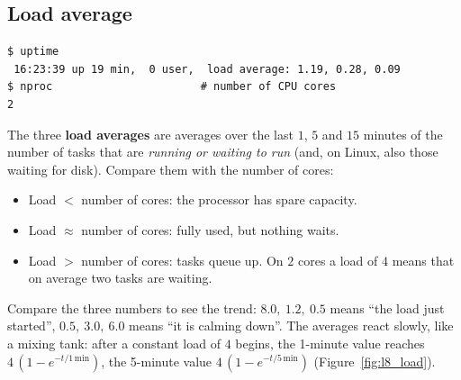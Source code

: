 \subsection*{Load average}
\begin{verbatim}
$ uptime
 16:23:39 up 19 min,  0 user,  load average: 1.19, 0.28, 0.09
$ nproc                       # number of CPU cores
2
\end{verbatim}
The three \textbf{load averages} are averages over the last $1$, $5$ and $15$ minutes of the number of tasks that are \emph{running or waiting to run} (and, on Linux, also those waiting for disk). Compare them with the number of cores:
\begin{itemize}[nosep]
  \item Load $<$ number of cores: the processor has spare capacity.
  \item Load $\approx$ number of cores: fully used, but nothing waits.
  \item Load $>$ number of cores: tasks queue up. On $2$ cores a load of $4$ means that on average two tasks are waiting.
\end{itemize}
Compare the three numbers to see the trend: $8.0,\ 1.2,\ 0.5$ means ``the load just started'', $0.5,\ 3.0,\ 6.0$ means ``it is calming down''. The averages react slowly, like a mixing tank: after a constant load of $4$ begins, the 1-minute value reaches $4\,(1-e^{-t/1\,\mathrm{min}})$, the 5-minute value $4\,(1-e^{-t/5\,\mathrm{min}})$ (Figure~\ref{fig:l8_load}).

\begin{center}
\label{fig:l8_load}
\end{center}

